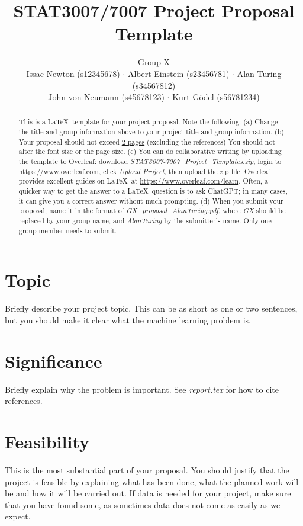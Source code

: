 \documentclass[a4paper,11pt]{article} %
\begin{document}
\title{STAT3007/7007 Project Proposal Template}
\author{Group X \\
Issac Newton (s12345678) $\cdot$
Albert Einstein (s23456781) $\cdot$
Alan Turing (s34567812) \\
John von Neumann (s45678123) $\cdot$ Kurt G\"odel (s56781234)}

\date{}
\maketitle

\begin{abstract}
	This is a \LaTeX\ template for your project proposal.
	Note the following: 
	(a) Change the title and group information above to your project title and
	group information.
	(b) Your proposal should not exceed \underline{2 pages} (excluding the
	references) 
	You should not alter the font size or the page size.
	(c) You can do collaborative writing by uploading the template to \underline{Overleaf}:
	download \emph{STAT3007-7007\_Project\_Templates.zip},
	login to \url{https://www.overleaf.com},
	click \emph{Upload Project},
	then upload the zip file.
	Overleaf provides excellent guides on \LaTeX\ at
	\url{https://www.overleaf.com/learn}.
	Often, a quicker way to get the answer to a \LaTeX\ question is to ask ChatGPT;
	in many cases, it can give you a correct answer without much prompting.
	(d) When you submit your proposal, name it in the format of
	\emph{GX\_proposal\_AlanTuring.pdf}, where 
	\emph{GX} should be replaced by your group name, and \emph{AlanTuring} by the
	submitter's name.
	Only one group member needs to submit.
\end{abstract}

\section{Topic}

Briefly describe your project topic.
This can be as short as one or two sentences, but you should make it clear what
the machine learning problem is.

\section{Significance}

Briefly explain why the problem is important.
See \emph{report.tex} for how to cite references.

\section{Feasibility}

This is the most substantial part of your proposal.
You should justify that the project is feasible by explaining what has been
done, what the planned work will be and how it will be carried out.  
If data is needed for your project, make sure that you have found some, as
sometimes data does not come as easily as we expect.

\smaller
\printbibliography
\end{document}
